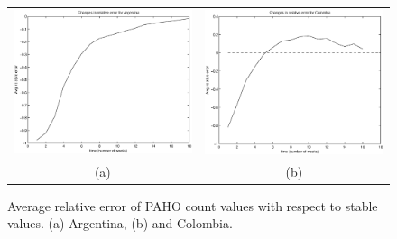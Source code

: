 \begin{figure}[h]
  \centering
   \begin{tabular}{cc}
     \includegraphics[width=.45\textwidth]{fig/forpaper_AVGrelativeALLs_Argentina.eps} &
     \includegraphics[width=.45\textwidth]{fig/forpaper_AVGrelativeALLs_Colombia.eps} \\
      (a) & (b) \\ %
  \end{tabular}
  \caption{Average relative error of PAHO count values with respect to stable values.
  (a) Argentina,
  (b) and Colombia.
  }
  \label{fig:relerrors}

\end{figure}

